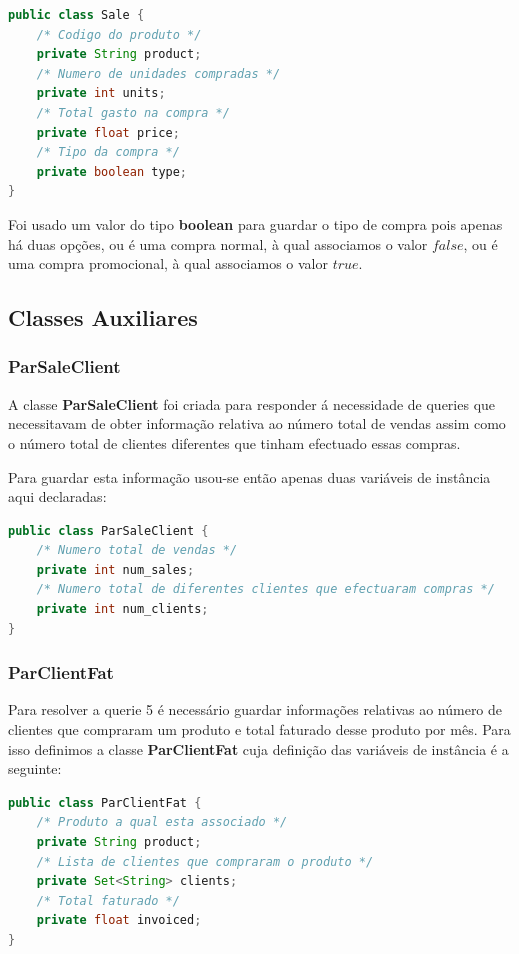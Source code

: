 \documentclass[10pt] {article}
\begin{document}
\begin{lstlisting}[language=Java]
public class Sale {
	/* Codigo do produto */
	private String product;
	/* Numero de unidades compradas */
	private int units;
	/* Total gasto na compra */
	private float price;
	/* Tipo da compra */
	private boolean type;
}
\end{lstlisting}

\par Foi usado um valor do tipo \textbf{boolean} para guardar o tipo de compra pois apenas há duas opções, ou é uma compra
normal, à qual associamos o valor $false$, ou é uma compra promocional, à qual associamos o valor $true$.

\subsection{Classes Auxiliares}
\subsubsection{ParSaleClient}
\par A classe \textbf{ParSaleClient} foi criada para responder á necessidade de queries que necessitavam de obter informação
relativa ao número total de vendas assim como o número total de clientes diferentes que tinham efectuado essas compras.
\par Para guardar esta informação usou-se então apenas duas variáveis de instância aqui declaradas:

\begin{lstlisting}[language=Java]
public class ParSaleClient {
	/* Numero total de vendas */
	private int num_sales;
	/* Numero total de diferentes clientes que efectuaram compras */
	private int num_clients;
}
\end{lstlisting}

\subsubsection{ParClientFat}
\par Para resolver a querie 5 é necessário guardar informações relativas ao número de clientes que compraram um produto
e total faturado desse produto por mês. Para isso definimos a classe \textbf{ParClientFat} cuja definição das variáveis de
instância é a seguinte:

\begin{lstlisting}[language=Java]
public class ParClientFat {
	/* Produto a qual esta associado */
	private String product;
	/* Lista de clientes que compraram o produto */
	private Set<String> clients;
	/* Total faturado */
	private float invoiced;
}
\end{lstlisting}
\end{document}
